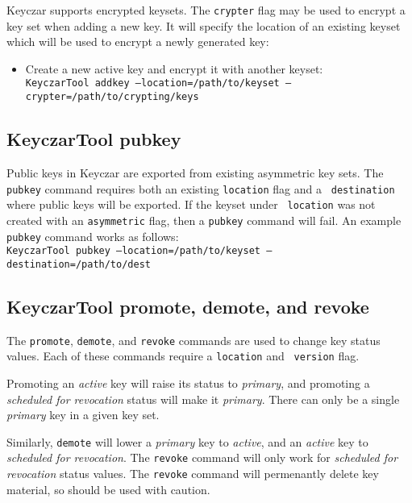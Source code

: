 \documentclass{llncs}
\begin{document}
Keyczar supports encrypted keysets. The {\tt crypter} flag may be used to
encrypt a key set when adding a new key. It will specify the location of an
existing keyset which will be used to encrypt a newly generated key: 
 
\begin{itemize}
\item Create a new active key and encrypt it with another keyset: \\
{\tt KeyczarTool addkey --location=/path/to/keyset
--crypter=/path/to/crypting/keys}
\end{itemize}

\subsection{KeyczarTool pubkey}

Public keys in Keyczar are exported from existing asymmetric key sets. The
{\tt pubkey} command requires both an existing {\tt location} flag and a {\tt
destination} where public keys will be exported. If the keyset under {\tt
location} was not created with an {\tt asymmetric} flag, then a {\tt pubkey}
command will fail. An example {\tt pubkey} command works as follows: \\
{\tt KeyczarTool pubkey --location=/path/to/keyset --destination=/path/to/dest}

\subsection{KeyczarTool promote, demote, and revoke}

The {\tt promote}, {\tt demote}, and {\tt revoke} commands are used to change
key status values. Each of these commands require a {\tt location} and {\tt
version} flag. 

Promoting an {\it active} key will raise its status to
{\it primary}, and promoting a {\it scheduled for revocation} status will make
it {\it primary}. There can only be a single {\it primary} key in a given key
set. 

Similarly, {\tt demote} will lower a {\it primary} key to {\it active},
and an {\it active} key to {\it scheduled for revocation}. The {\tt revoke}
command will only work for {\it scheduled for revocation} status values.
The {\tt revoke} command will permenantly delete key material, so should be
used with caution.
\end{document}
